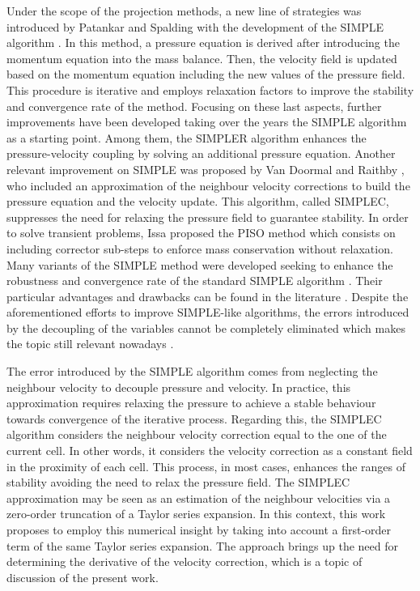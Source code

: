 \documentclass[final,3p,times,11pt,onecolumn]{myElsarticle}
\numberwithin{equation}{section}
\begin{document}
Under the scope of the projection methods, a new line of strategies was introduced by Patankar and Spalding with the development of the SIMPLE algorithm \cite{patankar1972}. In this method, a pressure equation is derived after introducing the momentum equation into the mass balance. Then, the velocity field is updated based on the momentum equation including the new values of the pressure field. This procedure is iterative and employs relaxation factors to improve the stability and convergence rate of the method. Focusing on these last aspects, further improvements have been developed taking over the years the SIMPLE algorithm as a starting
point. Among them, the SIMPLER algorithm \cite{patankar1980} enhances the pressure-velocity coupling by solving an additional pressure equation. Another relevant improvement on SIMPLE was proposed by Van Doormal and Raithby \cite{vanDoormal}, who included an approximation of the neighbour velocity corrections to build the pressure equation and the velocity update. This algorithm, called SIMPLEC, suppresses the need for relaxing the pressure field to guarantee stability. In order to solve transient problems, Issa proposed the PISO method \cite{issa,issa2} which consists on including corrector sub-steps to enforce mass conservation without relaxation. Many variants of the SIMPLE method were developed seeking to enhance the robustness and convergence rate of the standard SIMPLE algorithm \cite{tao,qu,cheng2,sun}. Their particular advantages and drawbacks can be found in the literature \cite{moukalled, liu, wang}. Despite the aforementioned efforts to improve SIMPLE-like algorithms, the errors introduced by the decoupling of the variables
cannot be completely eliminated which makes the topic still relevant nowadays \cite{li2017efficient, xiao2018consistent,aoussou2018iterated,aguerre2018oscillation}.

The error introduced by the SIMPLE algorithm comes from neglecting the neighbour velocity to decouple pressure and velocity. 
In practice, this approximation requires relaxing the pressure to achieve a stable behaviour towards convergence of the iterative process. Regarding this, the SIMPLEC algorithm considers the neighbour velocity correction equal to the one of the current cell. In other words, it considers the velocity correction as a constant field in the proximity of each cell. This process, in most cases, enhances the ranges of stability avoiding the need to relax the pressure field. The SIMPLEC approximation may be seen as an estimation of the neighbour velocities via a zero-order truncation of a Taylor series expansion. In this context, this work proposes to employ this numerical insight by taking into account a first-order term of the same Taylor series expansion. The approach brings up the need for determining the derivative of the velocity correction, which is a topic of discussion of the present work.
\end{document}
